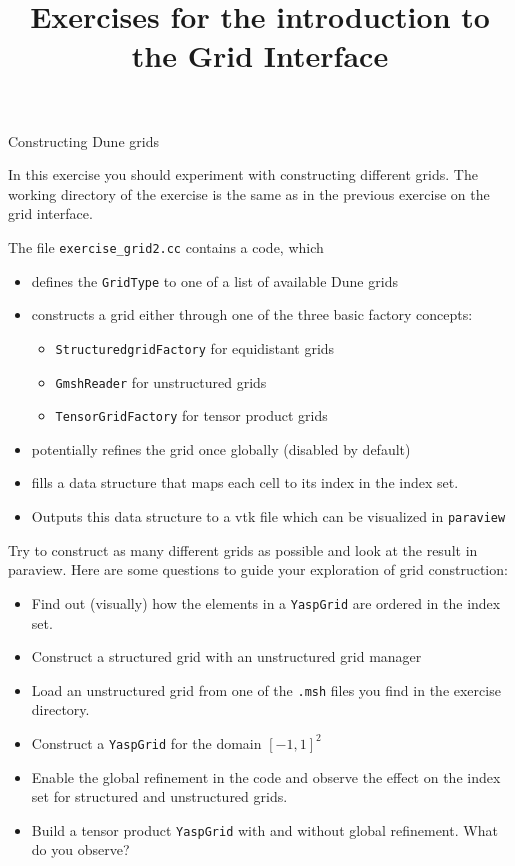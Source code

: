 \documentclass[12pt,a4paper]{article}
\title{\textbf{Exercises for the introduction to the Grid Interface}}
\begin{document}
\exerciseheader

\begin{Exercise}{Constructing Dune grids}

In this exercise you should experiment with constructing different grids. The working directory
of the exercise is the same as in the previous exercise on the grid interface.

The file \lstinline!exercise_grid2.cc! contains a code, which
\begin{itemize}
 \item defines the \lstinline!GridType! to one of a list of available Dune grids
 \item constructs a grid either through one of the three basic factory concepts:
  \begin{itemize}
   \item \lstinline!StructuredgridFactory! for equidistant grids
   \item \lstinline!GmshReader! for unstructured grids
   \item \lstinline!TensorGridFactory! for tensor product grids
  \end{itemize}
 \item potentially refines the grid once globally (disabled by default)
 \item fills a data structure that maps each cell to its index in the index set.
 \item Outputs this data structure to a vtk file which can be visualized in \lstinline!paraview!
\end{itemize}

Try to construct as many different grids as possible and look at the result in paraview.
Here are some questions to guide your exploration of grid construction:
\begin{itemize}
 \item Find out (visually) how the elements in a \lstinline!YaspGrid! are ordered in the index set.
 \item Construct a structured grid with an unstructured grid manager
 \item Load an unstructured grid from one of the \lstinline!.msh! files you find in the exercise directory.
 \item Construct a \lstinline!YaspGrid! for the domain $[-1,1]^2$
 \item Enable the global refinement in the code and observe the effect on the index set for structured and unstructured grids.
 \item Build a tensor product \lstinline!YaspGrid! with and without global refinement. What do you observe?
\end{itemize}

\end{Exercise}
\end{document}
